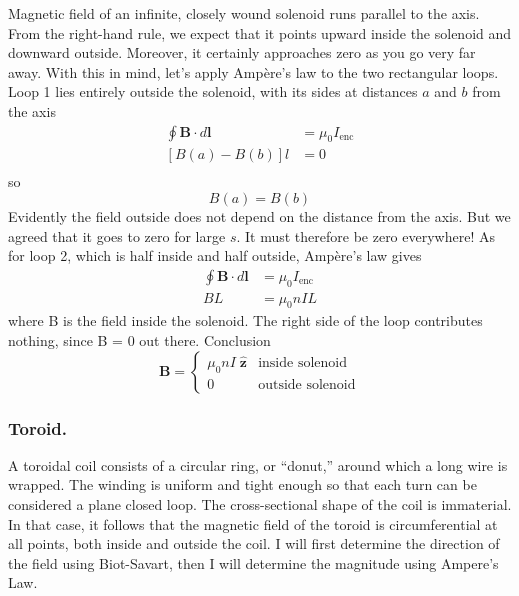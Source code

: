 \documentclass[../../../main.tex]{subfiles}
\begin{document}
Magnetic ﬁeld of an inﬁnite, closely wound solenoid runs parallel to the axis. From the right-hand rule, we expect that it points upward inside the solenoid and downward outside. Moreover, it certainly approaches zero as you go very far away. With this in mind, let’s apply Ampère’s law to the two rectangular loops. Loop 1 lies entirely outside the solenoid, with its sides at distances $a$ 
and $b$ from the axis
\begin{align*}
    \oint \mathbf{B}\cdot d\mathbf{l}&=\mu_0I_{\text{enc}}\\
    [B(a)-B(b)]l&=0\\
\end{align*}
so 
\begin{equation*}
    B(a)=B(b)
\end{equation*}
Evidently the ﬁeld outside does not depend on the distance from the axis. But we agreed that it goes to zero for large $s$. It must therefore be zero everywhere! As for loop 2, which is half inside and half outside, Ampère’s law gives
\begin{align*}
    \oint \mathbf{B}\cdot d\mathbf{l}&=\mu_0I_{\text{enc}}\\
    BL&=\mu_0nIL
\end{align*}
where B is the ﬁeld inside the solenoid. The right side of the loop contributes 
nothing, since B = 0 out there. Conclusion
\begin{equation*}
    \mathbf{B}=\begin{cases}
        \mu_0nI\;\mathbf{\hat{z}}&\text{inside solenoid}\\
        0&\text{outside solenoid}
    \end{cases}
\end{equation*}

\subsubsection*{Toroid.} A toroidal coil consists of a circular ring, or “donut,” around which a long wire is wrapped. The winding is uniform and tight enough so that each turn can be considered a plane closed loop. The cross-sectional shape of the coil is immaterial. In that case, it follows that the magnetic ﬁeld of the toroid is circumferential at all points, both inside and outside the coil. I will first determine the direction of the field using Biot-Savart, then I will determine the magnitude using Ampere's Law.

\begin{figure*}
    \centering
\end{figure*}
\end{document}

